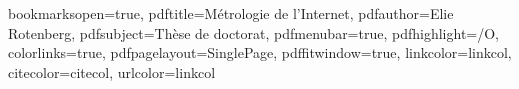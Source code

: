 \renewcommand{\nomname}{Liste des Abréviations}


\newcommand{\figsize}{0.8\columnwidth}

\setcounter{secnumdepth}{15}
\setcounter{tocdepth}{15}

\renewcommand*{\backref}[1]{}
\renewcommand*{\backrefalt}[4]{%
\ifcase #1 %
(Non cité.)%
\or
(Cité en page~#2.)%
\else
(Cité en pages~#2.)%
\fi}
\renewcommand*{\backrefsep}{, }
\renewcommand*{\backreftwosep}{ et~}
\renewcommand*{\backreflastsep}{ et~}

\makenomenclature



 \hypersetup
 {
 bookmarksopen=true,
 pdftitle=Métrologie de l'Internet,
 pdfauthor=Elie Rotenberg, %
 pdfsubject=Thèse de doctorat, %
 pdfmenubar=true, %
 pdfhighlight=/O, %
 colorlinks=true, %
 pdfpagelayout=SinglePage, %
 pdffitwindow=true, %
 linkcolor=linkcol, %
 citecolor=citecol, %
 urlcolor=linkcol %
 }


\setcounter{secnumdepth}{3}
\setcounter{tocdepth}{2}
\setlength{\parskip}{1ex plus 1ex minus 1ex}
